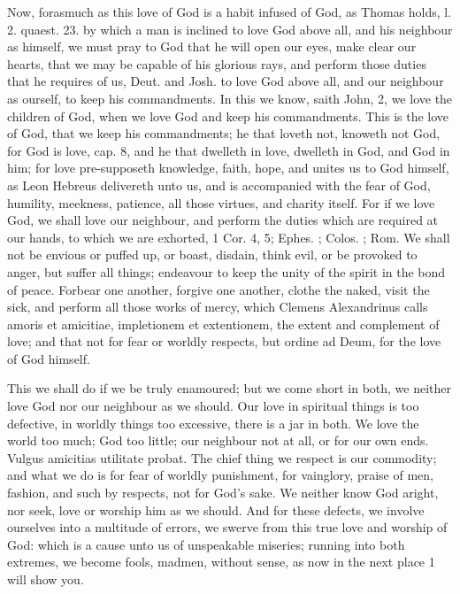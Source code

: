 {Now, forasmuch as this love of God is a habit infused of God, as 
Thomas holds, l. 2. quaest. 23. by which a man is inclined to love God
above all, and his neighbour as himself, we must pray to God that he
will open our eyes, make clear our hearts, that we may be capable of
his glorious rays, and perform those duties that he requires of us,
Deut.  and Josh.  to love God above all, and our neighbour as
ourself, to keep his commandments. In this we know, saith John,  
2, we love the children of God, when we love God and keep his
commandments. This is the love of God, that we keep his commandments;
he that loveth not, knoweth not God, for God is love, cap.  8, and
he that dwelleth in love, dwelleth in God, and God in him; for love
pre-supposeth knowledge, faith, hope, and unites us to God himself, as
Leon Hebreus delivereth unto us, and is accompanied with the fear
of God, humility, meekness, patience, all those virtues, and charity
itself. For if we love God, we shall love our neighbour, and perform
the duties which are required at our hands, to which we are exhorted, 1
Cor.  4, 5; Ephes. ; Colos. ; Rom.  We shall not be
envious or puffed up, or boast, disdain, think evil, or be provoked to
anger, but suffer all things; endeavour to keep the unity of the spirit
in the bond of peace. Forbear one another, forgive one another, clothe
the naked, visit the sick, and perform all those works of mercy, which
Clemens Alexandrinus calls amoris et amicitiae, impletionem et
extentionem, the extent and complement of love; and that not for fear
or worldly respects, but ordine ad Deum, for the love of God himself.

This we shall do if we be truly enamoured; but we come short in both,
we neither love God nor our neighbour as we should. Our love in
spiritual things is too defective, in worldly things too
excessive, there is a jar in both. We love the world too much; God too
little; our neighbour not at all, or for our own ends. Vulgus amicitias
utilitate probat. The chief thing we respect is our commodity; and what
we do is for fear of worldly punishment, for vainglory, praise of men,
fashion, and such by respects, not for God's sake. We neither know God
aright, nor seek, love or worship him as we should. And for these
defects, we involve ourselves into a multitude of errors, we swerve
from this true love and worship of God: which is a cause unto us of
unspeakable miseries; running into both extremes, we become fools,
madmen, without sense, as now in the next place 1 will show you.

}

